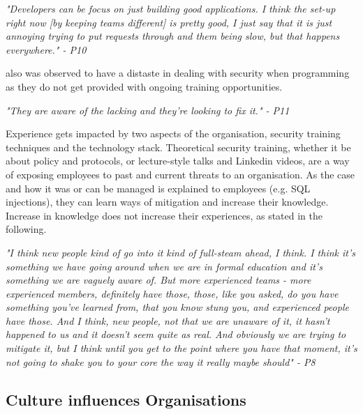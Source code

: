 \textit{"Developers can be focus on just building good applications. I think the set-up right now [by keeping teams different] is pretty good, I just say that it is just annoying trying to put requests through and them being slow, but that happens everywhere." - P10}
\newline
\par
[P4] also was observed to have a distaste in dealing with security when programming as they do not get provided with ongoing training opportunities. 
\newline
\par
\textit{"They are aware of the lacking and they're looking to fix it." - P11}
\newline
\par
Experience gets impacted by two aspects of the organisation, security training techniques and the technology stack. Theoretical security training, whether it be about policy and protocols, or lecture-style talks and Linkedin videos, are a way of exposing employees to past and current threats to an organisation. As the case and how it was or can be managed is explained to employees  (e.g. SQL injections), they can learn ways of mitigation and increase their knowledge. Increase in knowledge does not increase their experiences, as stated in the following. 
\newline
\par 
\textit{"I think new people kind of go into it kind of full-steam ahead, I think. I think it's something we have going around when we are in formal education and it's something we are vaguely aware of. But more experienced teams - more experienced members, definitely have those, those, like you asked, do you have something you've learned from, that you know stung you, and experienced people have those. And I think, new people, not that we are unaware of it, it hasn't happened to us and it doesn't seem quite as real. And obviously we are trying to mitigate it, but I think until you get to the point where you have that moment, it's not going to shake you to your core the way it really maybe should" - P8}

\subsection{Culture influences Organisations}

